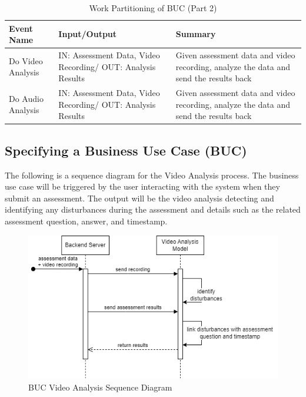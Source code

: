 \documentclass[12pt]{article}
\begin{document}
\newpage

\begin{table}[H]
  \centering
  \caption{Work Partitioning of BUC (Part 2)}
  \label{tab:work_partition_2}
  \begin{tabularx}{1.2\textwidth} { 
     | >{\raggedright\arraybackslash}X 
     | >{\raggedright\arraybackslash}X 
     | >{\raggedright\arraybackslash}X | }
  \hline
  \textbf{Event Name} & \textbf{Input/Output} & \textbf{Summary} \\
  \hline
  Do Video Analysis & IN: Assessment Data, Video Recording/ OUT: Analysis Results  & Given assessment data and video recording, analyze the data and send the results back\\
  \hline
  Do Audio Analysis & IN: Assessment Data, Video Recording/ OUT: Analysis Results & Given assessment data and video recording, analyze the data and send the results back \\
  \hline
  \end{tabularx}
\end{table}

\subsection{Specifying a Business Use Case (BUC)}
\hspace{2em}The following is a sequence diagram for the Video Analysis process. The business use case will be triggered by the user interacting with the system 
when they submit an assessment. The output will be the video analysis detecting and identifying any disturbances during the 
assessment and details such as the related assessment question, answer, and timestamp.

\begin{figure}[H]
  \centering
  \includegraphics[scale=0.5]{images/BUC.png}
  \caption{BUC Video Analysis Sequence Diagram}
\end{figure}
\end{document}
